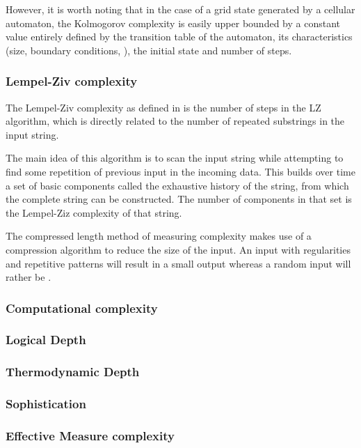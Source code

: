 However, it is worth noting that in the case of a grid state generated by a
cellular automaton, the Kolmogorov complexity is easily upper bounded by a
constant value entirely defined by the transition table of the automaton, its
characteristics (size, boundary conditions, \etc), the initial state and number
of steps.

\subsubsection{Lempel-Ziv complexity}\label{subsection:lempel-ziv}
The Lempel-Ziv complexity as defined in \parencite{lempelComplexityFiniteSequences1976} is the
number of steps in the LZ algorithm, which is directly related to the number of
repeated substrings in the input string.

The main idea of this algorithm is to scan the input string while attempting to
find some repetition of previous input in the incoming data. This builds over
time a set of basic components called the exhaustive history of the string, from
which the complete string can be constructed. The number of components in that
set is the Lempel-Ziz complexity of that string.

The compressed length method of measuring complexity makes use of a compression
algorithm to reduce the size of the input. An input with regularities and
repetitive patterns will result in a small output whereas a random input will
rather be .

\subsubsection{Computational complexity}

\subsubsection{Logical Depth}

\subsubsection{Thermodynamic Depth}

\subsubsection{Sophistication}

\subsubsection{Effective Measure complexity}
